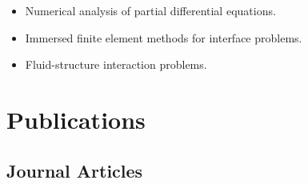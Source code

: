 \documentclass[11pt,letterpaper]{report}
\begin{document}
    \begin{itemize}

        \item Numerical analysis of partial differential equations. 
        \item Immersed finite element methods for interface problems. 
        \item Fluid-structure interaction problems. 

    \end{itemize}



    \section*{Publications}

    \subsection*{Journal Articles}
\end{document}
